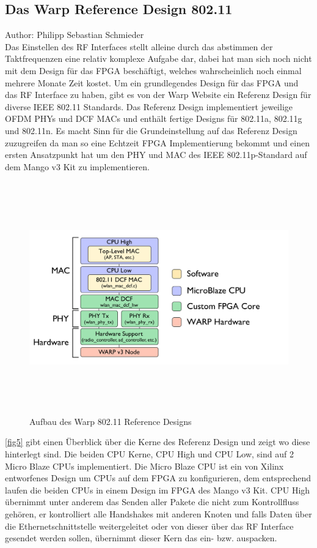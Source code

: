 \documentclass[letterpaper,11pt]{article}
\begin{document}
\begin{onehalfspace}
\section{Das Warp Reference Design 802.11}
\label{sc:802.11rd}
\small Author: Philipp Sebastian Schmieder\\
\Large
Das Einstellen des RF Interfaces stellt alleine durch das abstimmen der Taktfrequenzen eine relativ komplexe Aufgabe dar, dabei hat man sich noch nicht mit dem Design für das FPGA beschäftigt, welches wahrscheinlich noch einmal mehrere Monate Zeit kostet. Um ein grundlegendes Design für das FPGA und das RF Interface zu haben, gibt es von der Warp Website ein Referenz Design für diverse IEEE 802.11 Standards. Das Referenz Design implementiert jeweilige OFDM PHYs und DCF MACs und enthält fertige Designs für  802.11a, 802.11g und 802.11n. Es macht Sinn für die Grundeinstellung auf das Referenz Design zuzugreifen da man so eine Echtzeit FPGA Implementierung bekommt und einen ersten Ansatzpunkt hat um den PHY und MAC des IEEE 802.11p-Standard auf dem Mango v3 Kit zu implementieren. 
\begin{figure}[H]
\begin{center}
\includegraphics[width = 16cm,height=10cm]{Archreferencedesign.png}
\caption{Aufbau des Warp 802.11 Reference Designs  \cite{[5]}}
\label{fig5}
\end{center}
\end{figure}
\noindent \autoref{fig5} gibt einen Überblick über die Kerne des Referenz Design und zeigt wo diese hinterlegt sind. Die beiden CPU Kerne, CPU High und CPU Low, sind auf 2 Micro Blaze CPUs implementiert. Die Micro Blaze CPU ist ein von Xilinx entworfenes Design um CPUs auf dem FPGA zu konfigurieren, dem entsprechend laufen die beiden CPUs in einem Design im FPGA des Mango v3 Kit. CPU High übernimmt unter anderem das Senden aller Pakete die nicht zum Kontrollfluss gehören, er kontrolliert alle Handshakes mit anderen Knoten und falls Daten über die Ethernetschnittstelle weitergeleitet oder von dieser über das RF Interface gesendet werden sollen, übernimmt dieser Kern das ein- bzw. auspacken.

\end{onehalfspace}
\end{document}
